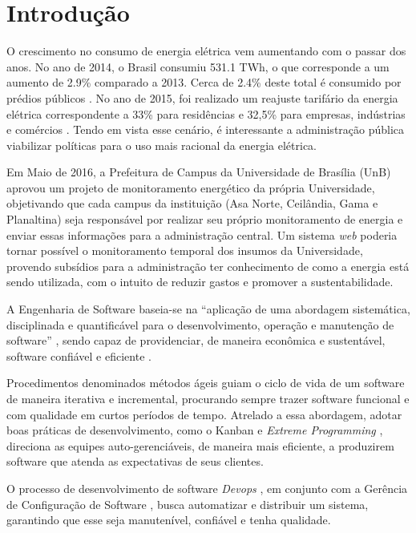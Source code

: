 \chapter{Introdução}
O crescimento no consumo de energia elétrica vem aumentando com o passar dos anos. No
ano de 2014, o Brasil consumiu 531.1 TWh, o que corresponde a um aumento de 2.9\% comparado a 2013. Cerca de 2.4\% deste total é consumido por prédios públicos \cite{balanco_energetico}. No ano de 2015, foi realizado um reajuste tarifário da energia elétrica correspondente a 33\% para residências e 32,5\% para empresas, indústrias e comércios \cite{aumento_energia}. Tendo em vista esse cenário, é interessante a administração pública viabilizar políticas para o uso mais racional da energia elétrica.

Em Maio de 2016, a Prefeitura de Campus da Universidade de Brasília (UnB) aprovou um projeto de monitoramento energético da própria Universidade, objetivando que cada campus da instituição (Asa Norte, Ceilândia, Gama e Planaltina) seja responsável por realizar seu próprio monitoramento de energia e enviar essas informações para a administração central. Um sistema \textit{web} poderia tornar possível o monitoramento temporal dos insumos da Universidade, provendo subsídios para a administração ter conhecimento de como a energia está sendo utilizada, com o intuito de reduzir gastos e promover a sustentabilidade.

A Engenharia de Software baseia-se na ``aplicação de uma abordagem sistemática, disciplinada e quantificável para o desenvolvimento, operação e manutenção de software'' \cite{ieee_glossary}, sendo capaz de providenciar, de maneira econômica e sustentável, software confiável e eficiente \cite{naur_1969}.

Procedimentos denominados métodos ágeis \cite{beck2001agile} guiam o ciclo de vida de um software de maneira iterativa e incremental, procurando sempre trazer software funcional e com qualidade em curtos períodos de tempo. Atrelado a essa abordagem, adotar boas práticas de desenvolvimento, como o Kanban \cite{radigan_2015} e \textit{Extreme Programming} \cite{beck_2004}, direciona as equipes auto-gerenciáveis, de maneira mais eficiente, a produzirem software que atenda as expectativas de seus clientes.

O processo de desenvolvimento de software \textit{Devops} \cite{loukides_2012}, em conjunto com a Gerência de Configuração de Software \cite{SWEBOK2014}, busca automatizar e distribuir um sistema, garantindo que esse seja manutenível, confiável e tenha qualidade.

